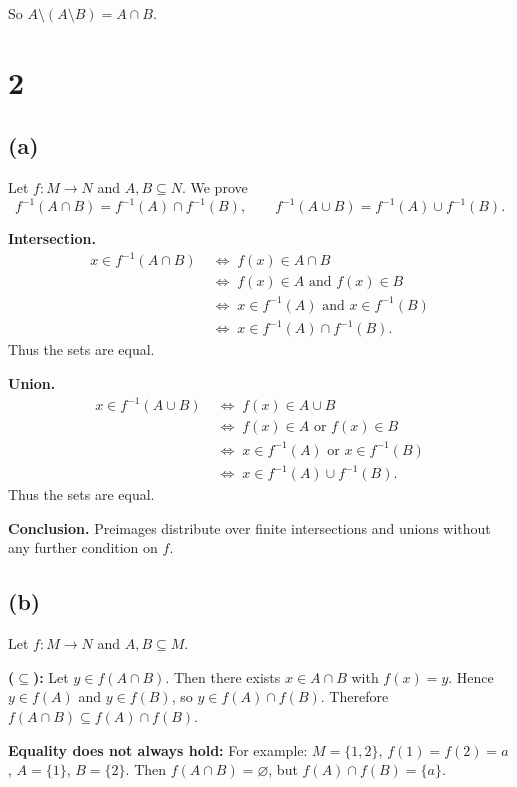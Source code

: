 \documentclass[12pt,a4paper]{article}
\theoremstyle{definition}
\theoremstyle{remark}
\begin{document}
So $A \setminus (A \setminus B) = A\cap B$.


\section*{2}

\subsection*{(a)}
Let \(f: M \to N\) and \(A,B \subseteq N\). We prove
\[
f^{-1}(A\cap B)=f^{-1}(A)\cap f^{-1}(B),
\qquad
f^{-1}(A\cup B)=f^{-1}(A)\cup f^{-1}(B).
\]

\textbf{Intersection.}
\[
\begin{aligned}
x \in f^{-1}(A\cap B)
&\;\Longleftrightarrow\; f(x)\in A\cap B \\
&\;\Longleftrightarrow\; f(x)\in A \text{ and } f(x)\in B \\
&\;\Longleftrightarrow\; x\in f^{-1}(A) \text{ and } x\in f^{-1}(B) \\
&\;\Longleftrightarrow\; x\in f^{-1}(A)\cap f^{-1}(B).
\end{aligned}
\]
Thus the sets are equal.

\textbf{Union.}
\[
\begin{aligned}
x \in f^{-1}(A\cup B)
&\;\Longleftrightarrow\; f(x)\in A\cup B \\
&\;\Longleftrightarrow\; f(x)\in A \text{ or } f(x)\in B \\
&\;\Longleftrightarrow\; x\in f^{-1}(A) \text{ or } x\in f^{-1}(B) \\
&\;\Longleftrightarrow\; x\in f^{-1}(A)\cup f^{-1}(B).
\end{aligned}
\]
Thus the sets are equal.

\textbf{Conclusion.} Preimages distribute over finite intersections and unions without any further condition on \(f\).

\subsection*{(b)}

Let $f : M \to N$ and $A,B \subseteq M$. 

\textbf{($\subseteq$):} Let $y \in f(A \cap B)$. Then there exists $x \in A \cap B$ with $f(x)=y$. Hence $y \in f(A)$ and $y \in f(B)$, so $y \in f(A) \cap f(B)$. Therefore $f(A \cap B) \subseteq f(A) \cap f(B)$.

\textbf{Equality does not always hold:} For example: $M=\{1,2\}$, $f(1)=f(2)=a$, $A=\{1\}$, $B=\{2\}$. Then $f(A \cap B)=\varnothing$, but $f(A)\cap f(B)=\{a\}$.
\end{document}
